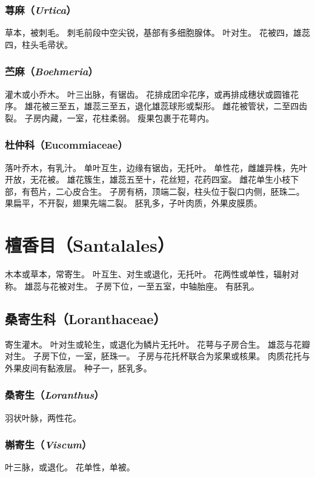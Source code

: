 \documentclass[11pt]{article}
\begin{document}
\begin{sloppypar}
\subsubsection{荨麻（\textit{Urtica}）}
草本，被刺毛。
刺毛前段中空尖锐，基部有多细胞腺体。
叶对生。
花被四，雄蕊四，柱头毛帚状。

\subsubsection{苎麻（\textit{Boehmeria}）}
灌木或小乔木。
叶三出脉，有锯齿。
花排成团伞花序，或再排成穗状或圆锥花序。
雄花被三至五，雄蕊三至五，退化雄蕊球形或梨形。
雌花被管状，二至四齿裂。
子房内藏，一室，花柱柔弱。
瘦果包裹于花萼内。

\subsubsection{杜仲科（Eucommiaceae）}
落叶乔木，有乳汁。
单叶互生，边缘有锯齿，无托叶。
单性花，雌雄异株，先叶开放，无花被。
雄花簇生，雄蕊五至十，花丝短，花药四室。
雌花单生小枝下部，有苞片，二心皮合生。
子房有柄，顶端二裂，柱头位于裂口内侧，胚珠二。
果扁平，不开裂，翅果先端二裂。
胚乳多，子叶肉质，外果皮膜质。

\section{檀香目（Santalales）}
木本或草本，常寄生。
叶互生、对生或退化，无托叶。
花两性或单性，辐射对称。
雄蕊与花被对生。
子房下位，一至五室，中轴胎座。
有胚乳。

\subsection{桑寄生科（Loranthaceae）}
寄生灌木。
叶对生或轮生，或退化为鳞片无托叶。
花萼与子房合生。
雄蕊与花瓣对生。
子房下位，一室，胚珠一。
子房与花托杯联合为浆果或核果。
肉质花托与外果皮间有黏液层。
种子一，胚乳多。

\subsubsection{桑寄生（\textit{Loranthus}）}
羽状叶脉，两性花。

\subsubsection{槲寄生（\textit{Viscum}）}
叶三脉，或退化。
花单性，单被。


\end{sloppypar}
\end{document}
